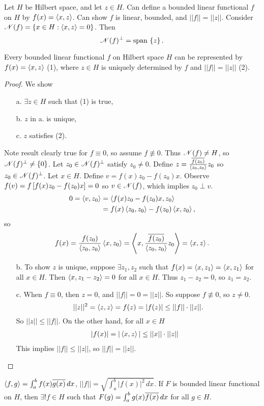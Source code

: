 \documentclass[]{article}
\begin{document}
\begin{example}
	Let $H$ be Hilbert space, and let $z\in H$.
	Can define a bounded linear functional $f$ on $H$ by $f(x) = \left\langle x,z \right\rangle$.
	Can show $f$ is linear, bounded, and $||f|| = ||z||$.
	Consider $\mathscr{N}(f) = \left\{ x\in H : \left\langle x,z \right\rangle=0 \right\}$.
	Then $$\mathscr{N}(f)^\perp = \text{span}\,\left\{ z \right\}.$$
\end{example}
\begin{theorem}
	Every bounded linear functional $f$ on Hilbert space $H$ can be represented by $f(x) = \left\langle x,z \right\rangle$ (1), where $z\in H$ is uniquely determined by $f$ and $||f||=||z||$ (2).
\end{theorem}
\begin{proof}
	We show
	\begin{enumerate}
		\item[a.] $\exists z\in H$ such that (1) is true,
		\item[b.] $z$ in a. is unique,
		\item[c.] $z$ satisfies (2).
	\end{enumerate}
	Note result clearly true for $f\equiv 0$, so assume $f\not\equiv0$.
	Thus $\mathscr{N}(f)\neq H$, so $\mathscr{N}(f)^\perp\neq\left\{ 0 \right\}$.
	Let $z_0\in\mathscr{N}(f)^\perp$ satisfy $z_0\neq0$.
	Define $z = \frac{\overline{f(z_0)}}{\left\langle z_0,z_0 \right\rangle}z_0$ so $z_0\in\mathscr{N}(f)^\perp$.
	Let $x\in H$. Define $v = f(x)z_0-f(z_0)x$.
	Observe $f(v) = f\left[f(x)z_0-f(z_0)x\right] = 0$ so $v\in\mathscr{N}(f)$, which implies $z_0\perp v$.
	\begin{align*}
		0 = \left\langle v,z_0 \right\rangle &= \left\langle f(x)z_0-f(z_0)x,z_0 \right\rangle \\
						&= f(x)\left\langle z_0,z_0 \right\rangle - f(z_0)\left\langle x,z_0 \right\rangle,
	\end{align*}
	so
	\begin{align*}
		f(x) = \frac{f(z_0)}{\left\langle z_0,z_0 \right\rangle}\left\langle x,z_0 \right\rangle = \left\langle x,\frac{\overline{f(z_0)}}{\left\langle z_0,z_0 \right\rangle}z_0 \right\rangle = \left\langle x,z \right\rangle.
	\end{align*}
	\begin{enumerate}
		\item[b.] To show $z$ is unique, suppose $\exists z_1,z_2$ such that $f(x) = \left\langle x,z_1 \right\rangle = \left\langle x,z_1 \right\rangle$ for all $x\in H$.
			Then $\left\langle x,z_1-z_2 \right\rangle=0$ for all $x\in H$.
			Thus $z_1-z_2=0$, so $z_1=z_2$.
		\item[c.] When $f\equiv0$, then $z=0$, and $||f||=0=||z||$.
			So suppose $f\not\equiv0$, so $z\neq0$.
			$$||z||^2 = \left\langle z,z \right\rangle = f(z) = |f(z)| \leq ||f||\cdot||z||.$$
			So $ ||z|| \leq ||f||$.
			On the other hand, for all $x\in H$
			\begin{align*}
				|f(x)| &= |\left\langle x,z \right\rangle|
					   \leq ||x||\cdot||z||
			\end{align*}
			This implies $||f||\leq||z||$, so $||f|| = ||z||$.
	\end{enumerate}
\end{proof}
\begin{example}
	[$H = L^2(a,b)$] $\left\langle f,g \right\rangle = \int_a^bf(x)\overline{g(x)}\,dx$, $||f|| = \sqrt{\int_a^b |f(x)|^2\,dx}$.
	If $F$ is bounded linear functional on $H$, then $\exists!f\in H$ such that $F(g) = \int_a^bg(x)\overline{f(x)}\,dx$ for all $g\in H$.
\end{example}
\end{document}
